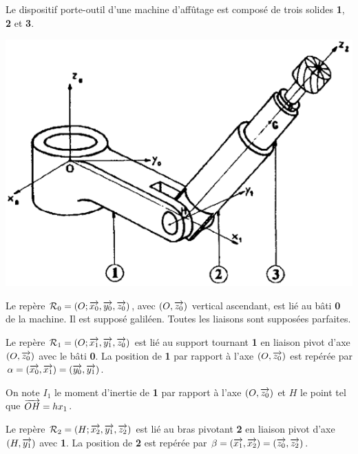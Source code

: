 \documentclass[10pt,fleqn]{article} %
\begin{document}
\def\pathfig{images}

\vspace{5cm}
\pagestyle{fancy}
\thispagestyle{plain}

\def\columnseprulecolor{\color{ocre}}
\setlength{\columnseprule}{0.4pt} 

\def\pathfig{images}

\ifprof
\else
\begin{multicols}{2}
\fi

Le dispositif porte-outil d'une machine d'affûtage est composé de trois solides \textbf{1}, \textbf{2} et \textbf{3}. 

\begin{center}
\includegraphics[width=\linewidth]{images/fig_01}
\end{center}
Le repère $\mathcal{R}_0=\left(O;\overrightarrow{x_0},\overrightarrow{y_0},\overrightarrow{z_0} \right)$, avec $\left(O,\overrightarrow{{z_0}}\right)$ vertical ascendant, est lié au bâti \textbf{0} de la machine. Il est supposé galiléen. Toutes les liaisons sont supposées parfaites.

Le repère $\mathcal{R}_1=\left(O;\overrightarrow{x_1},\overrightarrow{y_1},\overrightarrow{z_0} \right)$ est lié au support tournant \textbf{1} en liaison pivot d'axe $\left(O,\overrightarrow{z_0}\right)$ avec le bâti \textbf{0}. La position de \textbf{1} par rapport à l'axe $\left(O,\overrightarrow{z_0}\right)$ est repérée par $\alpha=\left(\overrightarrow{x_0},\overrightarrow{x_1}\right)=\left(\overrightarrow{y_0},\overrightarrow{y_1}\right)$. 

On note $I_1$ le moment d'inertie de \textbf{1} par rapport à l'axe $\left(O,\overrightarrow{z_0}\right)$ et $H$ le point tel que $\overrightarrow{OH}=h{x_1}$.

Le repère $\mathcal{R}_2=\left(H;\overrightarrow{x_2},\overrightarrow{y_1},\overrightarrow{z_2} \right)$ est lié au bras pivotant \textbf{2} en liaison pivot d'axe $\left(H,\overrightarrow{{y_1}}\right)$ avec \textbf{1}. La position de \textbf{2} est repérée par $\beta=\left(\overrightarrow{x_1},\overrightarrow{x_2}\right)=\left(\overrightarrow{z_0},\overrightarrow{z_2}\right)$. 


\end{multicols}
\end{document}
